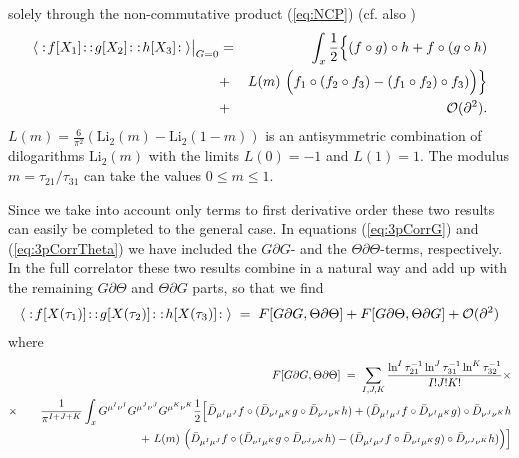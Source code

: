 \documentclass[a4paper,11pt]{article}               \def\new#1\endnew{{\bf #1}}
\let\bra=\langle        \let\ket=\rangle
\newcommand {\cO}{{\cal O}}
\newcommand {\Li} {\mathrm{Li}_2}
\begin{document}
solely through
the non-commutative product (\ref{eq:NCP}) (cf. also \cite{Cornalba:2002sm})
\begin{eqnarray}
  \label{eq:3pCorrTheta}
  \bra\;:\!f[X_1]\!: \, :\!g[X_2]\!:\; :\!h[X_3]\!:\;\ket
  \bigr|_{G = 0} &=& 
  \int _x \frac 12 \Bigl\{ (f \circ g) \circ h + f \circ (g \circ h)
\\
  &+& L(m)~\Bigl(f_1\circ (f_2\circ f_3) - (f_1\circ f_2)\circ f_3) 
  \Bigr) \Bigr\}
\nonumber\\
  &+& \cO(\partial^2).
\nonumber
\end{eqnarray}
$L(m) = \frac{6}{\pi^2}(\Li(m) - \Li(1-m))$ is an antisymmetric combination
of dilogarithms $\Li(m)$ with the limits $L(0) = -1$ and $L(1) = 1$.
The modulus $m = \tau_{21}/\tau_{31}$ can take the values $0 \leq m \leq 1$.

Since we take into account only terms to first derivative 
order these two results can easily be completed 
to the general case. In equations (\ref{eq:3pCorrG}) and
(\ref{eq:3pCorrTheta}) we have included the $G\partial G$- and the
$\Theta\partial\Theta$-terms, respectively. In the full correlator these
two results combine in a natural way and add up 
with the remaining $G\partial \Theta$ and $\Theta\partial G$ parts, so
that we find
\begin{eqnarray}
  \label{eq:3pCorr}
  \bra\;:\!f[X(\tau_1)]\!: \, :\!g[X(\tau_2)]\!:\; :\!h[X(\tau_3)]\!:\;\ket
  \; = \; F[G\partial G, \Theta\partial\Theta] + 
          F[G\partial\Theta, \Theta\partial G] + \cO(\partial^2)
\end{eqnarray}
where
\begin{eqnarray}
  \label{eq:GdGTdT}
  &&F[G\partial G, \Theta\partial\Theta] \; = \;\sum _{I,J,K} 
  \frac {\ln^I\tau_{21}^{-1} \ln^J\tau_{31}^{-1} \ln^K\tau_{32}^{-1}}
        {I! J! K!}\times
\\
  &\times& \frac 1{\pi^{I+J+K}} 
    \int _x G^{\mu^I\nu^I}G^{\mu^J\nu^J}G^{\mu^K\nu^K}
      \frac 12 \Bigl[ \bar D_{\mu^I\mu^J}f \circ 
      (\bar D_{\nu^I\mu^K}g \circ \bar D_{\nu^J\nu^K}h) +
      (\bar D_{\mu^I\mu^J}f \circ \bar D_{\nu^I\mu^K}g) 
      \circ \bar D_{\nu^J\nu^K}h 
\nonumber\\
  && \hspace*{3.5truecm}+~L(m)~\Bigl(\bar D_{\mu^I\mu^J}f\circ 
                 (\bar D_{\nu^I\mu^K}g\circ \bar D_{\nu^J\nu^K}h) - 
               (\bar D_{\mu^I\mu^J}f\circ \bar D_{\nu^I\mu^K}g)\circ 
                \bar D_{\nu^J\nu^K}h) 
  \Bigr) \Bigr]
\nonumber
\end{eqnarray}
\end{document}
